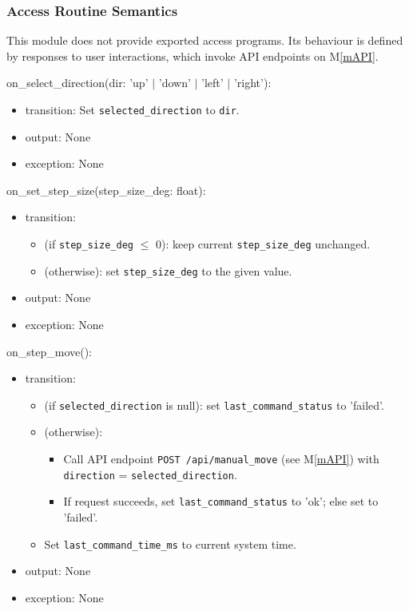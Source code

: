 \documentclass[12pt, titlepage]{article}
\newcommand{\mref}[1]{M\ref{#1}}
\begin{document}
\subsubsection{Access Routine Semantics}

This module does not provide exported access programs. Its behaviour is defined
by responses to user interactions, which invoke API endpoints on \mref{mAPI}.

\noindent on\_select\_direction(dir: 'up' $|$ 'down' $|$ 'left' $|$ 'right'):
\begin{itemize}
  \item transition: Set \texttt{selected\_direction} to \texttt{dir}.
  \item output: None
  \item exception: None
\end{itemize}

\noindent on\_set\_step\_size(step\_size\_deg: float):
\begin{itemize}
  \item transition:
        \begin{itemize}
          \item (if \texttt{step\_size\_deg} $\le$ 0): keep current \texttt{step\_size\_deg} unchanged.
          \item (otherwise): set \texttt{step\_size\_deg} to the given value.
        \end{itemize}
  \item output: None
  \item exception: None
\end{itemize}

\noindent on\_step\_move():
\begin{itemize}
  \item transition:
        \begin{itemize}
          \item (if \texttt{selected\_direction} is null): set \texttt{last\_command\_status} to 'failed'.
          \item (otherwise):
                \begin{itemize}
                  \item Call API endpoint \texttt{POST /api/manual\_move} (see \mref{mAPI}) with
                        \texttt{direction} = \texttt{selected\_direction}.
                  \item If request succeeds, set \texttt{last\_command\_status} to 'ok'; else set to
                        'failed'.
                \end{itemize}
          \item Set \texttt{last\_command\_time\_ms} to current system time.
        \end{itemize}
  \item output: None
  \item exception: None
\end{itemize}
\end{document}
